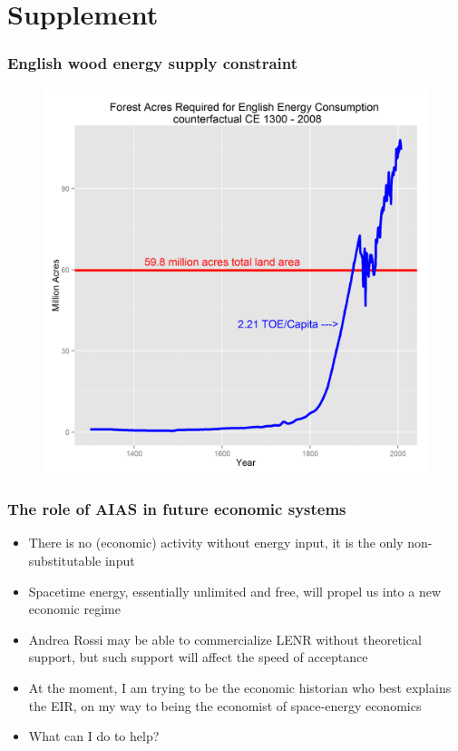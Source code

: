 \documentclass[final]{beamer}
\begin{document}
\section{Supplement}

\begin{frame}
\frametitle{English wood energy supply constraint}
\begin{figure}[p!]
\center
\label{fig:wood}
\includegraphics[height=0.8\textheight]{wood}
\end{figure}
\end{frame}

\begin{frame}
\frametitle{The role of AIAS in future economic systems}
\begin{itemize}
\item There is no (economic) activity without energy input, it is the only non-substitutable input \pause
\item Spacetime energy, essentially unlimited and free, will propel us into a new economic regime \pause
\item Andrea Rossi may be able to commercialize LENR without theoretical support, but such support will affect the speed of acceptance \pause
\item At the moment, I am trying to be the economic historian who best explains the EIR, on my way to being the economist of space-energy economics \pause
\item What can I do to help?
\end{itemize}
\end{frame}
\end{document}
